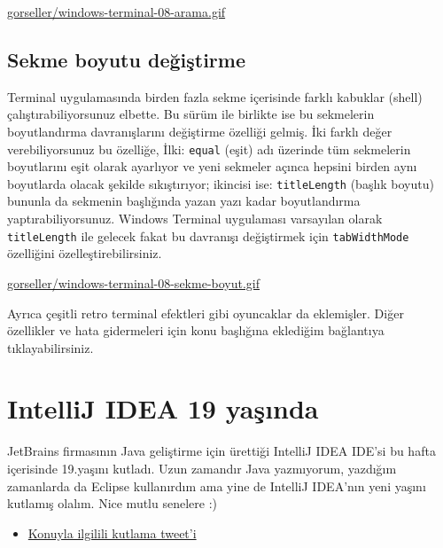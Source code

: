\documentclass[11pt]{article}
\begin{document}
\url{gorseller/windows-terminal-08-arama.gif}
\subsection{Sekme boyutu değiştirme}
\label{sec:orgc678cfc}
Terminal uygulamasında birden fazla sekme içerisinde farklı kabuklar (shell)
çalıştırabiliyorsunuz elbette. Bu sürüm ile birlikte ise bu sekmelerin
boyutlandırma davranışlarını değiştirme özelliği gelmiş. İki farklı değer
verebiliyorsunuz bu özelliğe, İlki: \texttt{equal} (eşit) adı üzerinde tüm sekmelerin
boyutlarını eşit olarak ayarlıyor ve yeni sekmeler açınca hepsini birden aynı
boyutlarda olacak şekilde sıkıştırıyor; ikincisi ise: \texttt{titleLength} (başlık
boyutu) bununla da sekmenin başlığında yazan yazı kadar boyutlandırma
yaptırabiliyorsunuz. Windows Terminal uygulaması varsayılan olarak
\texttt{titleLength} ile gelecek fakat bu davranışı değiştirmek için \texttt{tabWidthMode}
özelliğini özelleştirebilirsiniz.

\url{gorseller/windows-terminal-08-sekme-boyut.gif}

Ayrıca çeşitli retro terminal efektleri gibi oyuncaklar da eklemişler. Diğer
özellikler ve hata gidermeleri için konu başlığına eklediğim bağlantıya
tıklayabilirsiniz.
\section{IntelliJ IDEA 19 yaşında}
\label{sec:org11247c1}
JetBrains firmasının Java geliştirme için ürettiği IntelliJ IDEA IDE'si bu
hafta içerisinde 19.yaşını kutladı. Uzun zamandır Java yazmıyorum, yazdığım
zamanlarda da Eclipse kullanırdım ama yine de IntelliJ IDEA'nın yeni yaşını
kutlamış olalım. Nice mutlu senelere :)

\begin{itemize}
\item \href{https://twitter.com/intellijidea/status/1218172414615597061}{Konuyla ilgilili kutlama tweet'i}
\end{itemize}
\newpage
\end{document}
